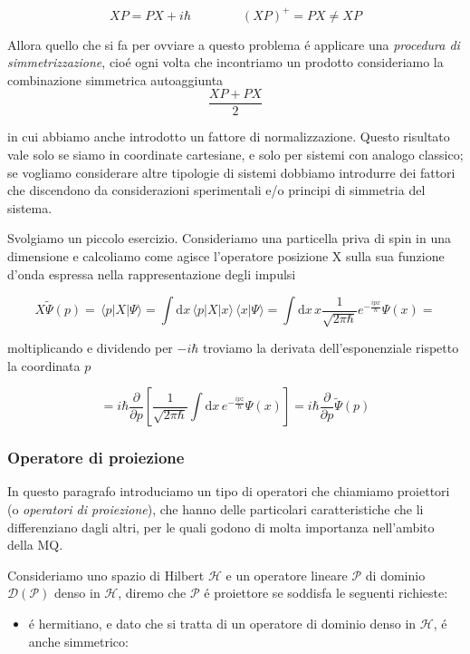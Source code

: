 \begin{enumerate}
\begin{equation}
	X P=P X+i\hbar\qquad\qquad (X P)^{+}=P X\neq X P
\end{equation}

Allora quello che si fa per ovviare a questo problema \'e applicare una \textit{procedura di simmetrizzazione}, cio\'e ogni volta che incontriamo un prodotto consideriamo la combinazione simmetrica autoaggiunta
\begin{equation}
	\frac{X P+P X}{2}
\end{equation}

in cui abbiamo anche introdotto un fattore di normalizzazione. Questo risultato vale solo se siamo in coordinate cartesiane, e solo per sistemi con analogo classico; se vogliamo considerare altre tipologie di sistemi dobbiamo introdurre dei fattori che discendono da considerazioni sperimentali e/o principi di simmetria del sistema.

Svolgiamo un piccolo esercizio. Consideriamo una particella priva di spin in una dimensione e calcoliamo come agisce l'operatore posizione X sulla sua funzione d'onda espressa nella rappresentazione degli impulsi

$$X\tilde{\Psi}(p)=\,\langle p|X|\Psi\rangle=\int\mathrm{d}x\,\langle p|X|x\rangle\,\langle x|\Psi\rangle=\int\mathrm{d}x\,x\frac{1}{\sqrt{2\pi\hbar}}e^{-\frac{i p x}{\hbar}}\Psi(x)=$$

moltiplicando e dividendo per $-i\hbar$ troviamo la derivata dell'esponenziale rispetto la coordinata $p$

$$=i\hbar{\frac{\partial}{\partial p}}\left[{\frac{1}{\sqrt{2\pi\hbar}}}\int\mathrm{d}x\,e^{-{\frac{i p z}{\hbar}}}\Psi(x)\right]=i\hbar{\frac{\partial}{\partial p}}{\tilde{\Psi}}(p)$$


\subsubsection{Operatore di proiezione}

In questo paragrafo introduciamo un tipo di operatori che chiamiamo proiettori (o \textit{operatori di proiezione}), che hanno delle particolari caratteristiche che li differenziano dagli altri, per le quali godono di molta importanza nell'ambito della MQ.

Consideriamo uno spazio di Hilbert $\mathcal{H}$ e un operatore lineare $\mathcal{P}$ di dominio $\mathcal{D}(\mathcal{P})$ denso in $\mathcal{H}$, diremo che $\mathcal{P}$ \'e proiettore se soddisfa le seguenti richieste:
\begin{itemize}
\item \'e hermitiano, e dato che si tratta di un operatore di dominio denso in $\mathcal{H}$, \'e anche simmetrico:


\end{itemize}
\end{enumerate}
